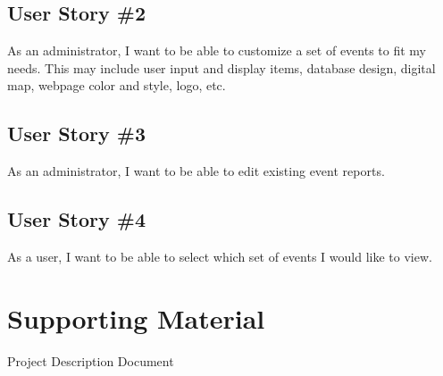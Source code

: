 \subsection{User Story \#2} 
As an administrator, I want to be able to customize a set of events to fit my needs. This may include user input and display items, database design, digital map, webpage color and style, logo, etc. 

\subsection{User Story \#3} 
As an administrator, I want to be able to edit existing event reports.

\subsection{User Story \#4} 
As a user, I want to be able to select which set of events I would like to view.

\section{Supporting Material}
Project Description Document

